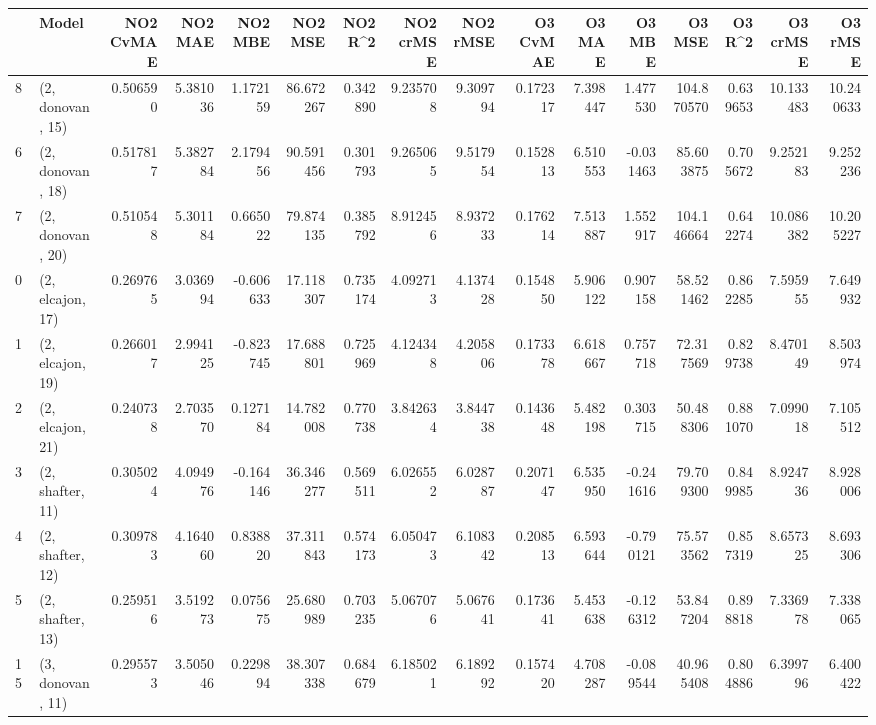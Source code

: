 \begin{tabular}{llrrrrrrrrrrrrrr}
\toprule
{} &             Model &  NO2 CvMAE &   NO2 MAE &   NO2 MBE &     NO2 MSE &   NO2 R\textasciicircum2 &  NO2 crMSE &   NO2 rMSE &  O3 CvMAE &     O3 MAE &    O3 MBE &      O3 MSE &    O3 R\textasciicircum2 &   O3 crMSE &    O3 rMSE \\
\midrule
8  &  (2, donovan, 15) &   0.506590 &  5.381036 &  1.172159 &   86.672267 &  0.342890 &   9.235708 &   9.309794 &  0.172317 &   7.398447 &  1.477530 &  104.870570 &  0.639653 &  10.133483 &  10.240633 \\
6  &  (2, donovan, 18) &   0.517817 &  5.382784 &  2.179456 &   90.591456 &  0.301793 &   9.265065 &   9.517954 &  0.152813 &   6.510553 & -0.031463 &   85.603875 &  0.705672 &   9.252183 &   9.252236 \\
7  &  (2, donovan, 20) &   0.510548 &  5.301184 &  0.665022 &   79.874135 &  0.385792 &   8.912456 &   8.937233 &  0.176214 &   7.513887 &  1.552917 &  104.146664 &  0.642274 &  10.086382 &  10.205227 \\
0  &  (2, elcajon, 17) &   0.269765 &  3.036994 & -0.606633 &   17.118307 &  0.735174 &   4.092713 &   4.137428 &  0.154850 &   5.906122 &  0.907158 &   58.521462 &  0.862285 &   7.595955 &   7.649932 \\
1  &  (2, elcajon, 19) &   0.266017 &  2.994125 & -0.823745 &   17.688801 &  0.725969 &   4.124348 &   4.205806 &  0.173378 &   6.618667 &  0.757718 &   72.317569 &  0.829738 &   8.470149 &   8.503974 \\
2  &  (2, elcajon, 21) &   0.240738 &  2.703570 &  0.127184 &   14.782008 &  0.770738 &   3.842634 &   3.844738 &  0.143648 &   5.482198 &  0.303715 &   50.488306 &  0.881070 &   7.099018 &   7.105512 \\
3  &  (2, shafter, 11) &   0.305024 &  4.094976 & -0.164146 &   36.346277 &  0.569511 &   6.026552 &   6.028787 &  0.207147 &   6.535950 & -0.241616 &   79.709300 &  0.849985 &   8.924736 &   8.928006 \\
4  &  (2, shafter, 12) &   0.309783 &  4.164060 &  0.838820 &   37.311843 &  0.574173 &   6.050473 &   6.108342 &  0.208513 &   6.593644 & -0.790121 &   75.573562 &  0.857319 &   8.657325 &   8.693306 \\
5  &  (2, shafter, 13) &   0.259516 &  3.519273 &  0.075675 &   25.680989 &  0.703235 &   5.067076 &   5.067641 &  0.173641 &   5.453638 & -0.126312 &   53.847204 &  0.898818 &   7.336978 &   7.338065 \\
15 &  (3, donovan, 11) &   0.295573 &  3.505046 &  0.229894 &   38.307338 &  0.684679 &   6.185021 &   6.189292 &  0.157420 &   4.708287 & -0.089544 &   40.965408 &  0.804886 &   6.399796 &   6.400422 \\

\end{tabular}
